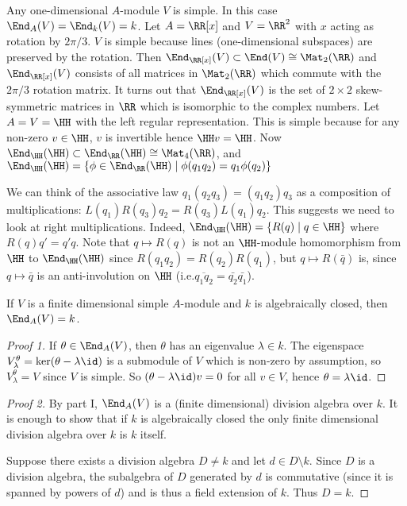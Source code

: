 \begin{exam}
	\begin{enum}
		\io Any one-dimensional $A$-module $V$ is simple.
		In this case $\End_A(V) = \End_k(V) = k$.
		\io Let $A=\RR[x]$ and $V=\RR^2$ with $x$ acting as rotation by $2\pi/3$.
		$V$ is simple because lines (one-dimensional subspaces) are preserved by the rotation.
		Then $\End_{\RR[x]}(V) \subset \End(V) \cong \Mat_2(\RR)$ and $\End_{\RR[x]}(V)$ consists of all matrices in $\Mat_2(\RR)$ which commute with the $2\pi/3$ rotation matrix.
		It turns out that $\End_{\RR[x]}(V)$ is the set of $2 \times 2$ skew-symmetric matrices in $\RR$ which is isomorphic to the complex numbers.
		\io Let $A=V=\HH$ with the left regular representation.
		This is simple because for any non-zero $v \in \HH$, $v$ is invertible hence $\HH v = \HH$.
		Now $\End_\HH(\HH) \subset \End_\RR(\HH) \cong \Mat_4(\RR)$, and $\End_\HH(\HH) = \{\phi \in \End_\RR(\HH) \mid \phi(q_1q_2) = q_1\phi(q_2)\}$
		
		We can think of the associative law $q_1(q_2q_3)=(q_1q_2)q_3$ as a composition of multiplications: $L(q_1)R(q_3)q_2=R(q_3)L(q_1)q_2$.
		This suggests we need to look at right multiplications.
		Indeed, $\End_\HH(\HH) = \{R(q) \mid q \in \HH\}$ where $R(q)q' = q'q$.
		Note that $q \mapsto R(q)$ is not an $\HH$-module homomorphism from $\HH$ to $\End_\HH(\HH)$ since $R(q_1q_2)=R(q_2)R(q_1)$, but $q \mapsto R(\bar{q})$ is, since $q \mapsto \bar q$ is an anti-involution on $\HH$ (i.e.\@ $\overline{q_1q_2}=\bar{q_2}\bar{q_1}$).
	\end{enum}
\end{exam}

\begin{thm}
	If $V$ is a finite dimensional simple $A$-module and $k$ is algebraically closed, then $\End_A(V)=k$.
\end{thm}

\begin{proof}[Proof 1]
	If $\theta \in \End_A(V)$, then $\theta$ has an eigenvalue $\lambda \in k$.
	The eigenspace $V_\lambda^\theta = \ker(\theta-\lambda\id)$ is a submodule of $V$ which is non-zero by assumption, so $V_\lambda^\theta=V$ since $V$ is simple.
	So $(\theta-\lambda\id)v=0$ for all $v \in V$, hence $\theta=\lambda\id$.
\end{proof}

\begin{proof}[Proof 2]
	By part I, $\End_A(V)$ is a (finite dimensional) division algebra over $k$.
	It is enough to show that if $k$ is algebraically closed the only finite dimensional division algebra over $k$ is $k$ itself.
	
	Suppose there exists a division algebra $D \neq k$ and let $d \in D \setminus k$.
	Since $D$ is a division algebra, the subalgebra of $D$ generated by $d$ is commutative (since it is spanned by powers of $d$) and is thus a field extension of $k$.
	Thus $D=k$.
\end{proof}


